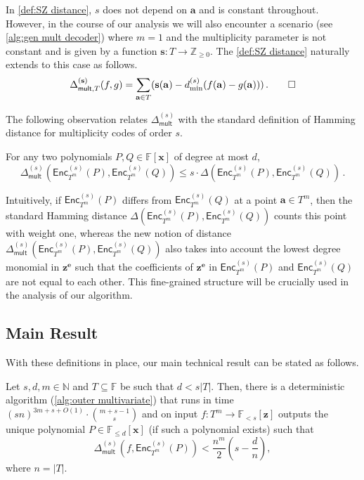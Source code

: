 \documentclass{theoretics}
\def\Integer{\mathbb{Z}}
\def\Natural{\mathbb{N}}
\def\Field{\mathbb{F}}
\let\N\Natural
\let\Z\Integer
\let\F\Field
\def\abs#1{\left| #1 \right|}
\def\veca{\mathbf{a}}
\def\vece{\mathbf{e}}
\def\vecx{\mathbf{x}}
\def\vecz{\mathbf{z}}
\newcommand{\encst}{{\mathsf{Enc}_{T^m}^{(s)}}}
\newcommand{\Del}{\Delta}
\newcommand{\Delm}{\Delta_{\mathsf{mult}}}
\newcommand{\vz}{\vecz}
\newcommand{\vx}{\vecx}
\newcommand{\ve}{\vece}
\newcommand{\va}{\veca}
\newcommand{\sbar}{\mathbf{s}}
\begin{document}
	\begin{remark}\label{rmk:Delm for non-constant s}
		In \cref{def:SZ distance}, $s$ does not depend on $\va$ and is
		constant throughout. However, in the course of our analysis we will
		also encounter a scenario (see \cref{alg:gen mult decoder}) where $m =
		1$ and the multiplicity parameter is not constant and is given by a
		function $\sbar\colon T \to \Z_{\geq 0}$. The \cref{def:SZ distance} naturally extends to this case as follows.
		\[ \Delta_{\mathsf{mult}, T}^{(\sbar)} (f, g) = \sum_{\va \in T} (\sbar(\va) - d^{(s)}_{\min}(f(\va) - g(\va)))\,.\qedhere\]
	\end{remark}
	
	
	The following observation relates $\Delm^{(s)}$ with the standard definition of Hamming distance for multiplicity codes of order $s$. 
	\begin{observation}\label{obs:delm vs del}
		For any two polynomials $P, Q \in \F[\vx]$ of degree at most $d$, 
		\[
		\Delm^{(s)}(\encst(P), \encst(Q)) \leq s\cdot \Del(\encst(P), \encst(Q)) \, .
		\]
	\end{observation}
	Intuitively, if $\encst(P)$ differs from $\encst(Q)$ at a point 
	$\va \in T^m$, then the standard Hamming distance $\Del(\encst(P), \encst(Q))$ counts this point with weight one, whereas the new notion of distance $\Delm^{(s)}(\encst(P), \encst(Q))$ also takes into account 
	the lowest degree monomial in $\vz^{\ve}$ such that the coefficients of $\vz^{\ve}$ in $\encst(P)$ and $\encst(Q)$ are not equal to each other. This fine-grained structure will be crucially used in the analysis of our algorithm. 
	
	\subsection{Main Result}
	
	With these definitions in place, our main technical result can be stated as follows. 
	\begin{theorem}\label{thm:main tech result}
		Let $s, d, m \in \N$ and $T \subseteq \F$ be such that $d <
		s|T|$. Then, there is a deterministic algorithm (\cref{alg:outer multivariate})
		that runs in time $(sn)^{3m + s + O(1)}\cdot \binom{m+s-1}{s}$ and on input
		$f\colon T^m \to \mathbb{F}_{<s}[\vz]$ outputs the unique polynomial
		$P \in \mathbb{F}_{\leq d}[\vx]$ (if such a polynomial exists) such
		that
		\[\Delm^{(s)}(f, \encst(P)) < \frac{n^m}{2}\left(s-\frac{d}{n}\right),\]
		where $n = \abs{T}$.
	\end{theorem}
	
\end{document}
